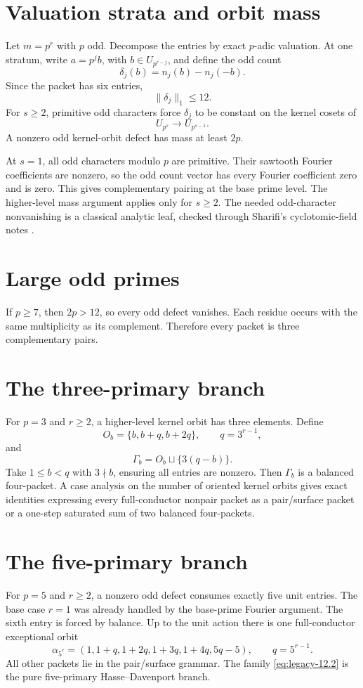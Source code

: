 \section{Valuation strata and orbit mass}
Let \(m=p^r\) with \(p\) odd. Decompose the entries by exact \(p\)-adic valuation. At one stratum, write \(a=p^jb\), with \(b\in U_{p^{r-j}}\), and define the odd count
\[
\delta_j(b)=n_j(b)-n_j(-b).
\]
Since the packet has six entries,
\begin{equation}\label{eq:legacy-12.1}
\|\delta_j\|_1\le 12.\end{equation}
For $s\ge2$, primitive odd characters force \(\delta_j\) to be constant on the kernel cosets of
\[
U_{p^s}\to U_{p^{s-1}}.
\]
A nonzero odd kernel-orbit defect has mass at least \(2p\).

At $s=1$, all odd characters modulo $p$ are primitive. Their sawtooth Fourier coefficients are nonzero, so the odd count vector has every Fourier coefficient zero and is zero. This gives complementary pairing at the base prime level. The higher-level mass argument applies only for $s\ge2$. The needed odd-character nonvanishing is a classical analytic leaf, checked through Sharifi's cyclotomic-field notes \cite{SharifiDirichlet}.

\section{Large odd primes}
If \(p\ge7\), then \(2p>12\), so every odd defect vanishes. Each residue occurs with the same multiplicity as its complement. Therefore every packet is three complementary pairs.

\section{The three-primary branch}
For $p=3$ and $r\ge2$, a higher-level kernel orbit has three elements. Define
\[
O_b=\{b,b+q,b+2q\},
\qquad q=3^{r-1},
\]
and
\[
\Gamma_b=O_b\sqcup\{3(q-b)\}.
\]
Take $1\le b<q$ with $3\nmid b$, ensuring all entries are nonzero. Then \(\Gamma_b\) is a balanced four-packet. A case analysis on the number of oriented kernel orbits gives exact identities expressing every full-conductor nonpair packet as a pair/surface packet or a one-step saturated sum of two balanced four-packets.

\section{The five-primary branch}
For $p=5$ and $r\ge2$, a nonzero odd defect consumes exactly five unit entries. The base case $r=1$ was already handled by the base-prime Fourier argument. The sixth entry is forced by balance. Up to the unit action there is one full-conductor exceptional orbit
\begin{equation}\label{eq:legacy-12.2}
\boxed{
\alpha_{5^r}=
(1,1+q,1+2q,1+3q,1+4q,5q-5),
\qquad q=5^{r-1}.
}\end{equation}
All other packets lie in the pair/surface grammar. The family \eqref{eq:legacy-12.2} is the pure five-primary Hasse--Davenport branch.



